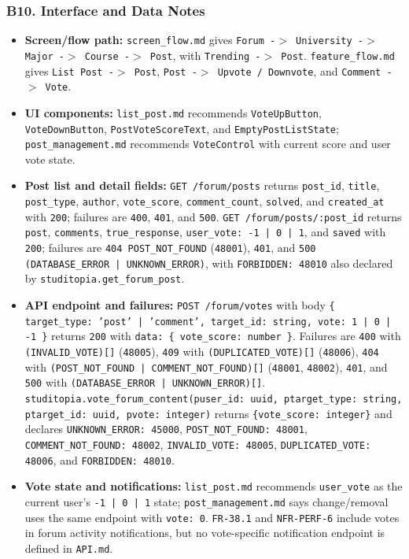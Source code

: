 \documentclass[12pt]{article}
\begin{document}
\hypertarget{sec:b10-interface-and-data-notes}{}
\subsubsection*{B10. Interface and Data Notes}
\par\medskip

\begin{itemize}
\item \textbf{Screen/flow path:} \texttt{screen\_flow.md} gives \texttt{Forum -$>$ University -$>$ Major -$>$ Course -$>$ Post}, with \texttt{Trending -$>$ Post}. \texttt{feature\_flow.md} gives \texttt{List Post -$>$ Post}, \texttt{Post -$>$ Upvote / Downvote}, and \texttt{Comment -$>$ Vote}.
\item \textbf{UI components:} \texttt{list\_post.md} recommends \texttt{VoteUpButton}, \texttt{VoteDownButton}, \texttt{PostVoteScoreText}, and \texttt{EmptyPostListState}; \texttt{post\_management.md} recommends \texttt{VoteControl} with current score and user vote state.
\item \textbf{Post list and detail fields:} \texttt{GET /forum/posts} returns \texttt{post\_id}, \texttt{title}, \texttt{post\_type}, \texttt{author}, \texttt{vote\_score}, \texttt{comment\_count}, \texttt{solved}, and \texttt{created\_at} with \texttt{200}; failures are \texttt{400}, \texttt{401}, and \texttt{500}. \texttt{GET /forum/posts/:post\_id} returns \texttt{post}, \texttt{comments}, \texttt{true\_response}, \texttt{user\_vote: -1 | 0 | 1}, and \texttt{saved} with \texttt{200}; failures are \texttt{404 POST\_NOT\_FOUND} (\texttt{48001}), \texttt{401}, and \texttt{500 (DATABASE\_ERROR | UNKNOWN\_ERROR)}, with \texttt{FORBIDDEN: 48010} also declared by \texttt{studitopia.get\_forum\_post}.
\item \textbf{API endpoint and failures:} \texttt{POST /forum/votes} with body \texttt{\{ target\_type: 'post' | 'comment', target\_id: string, vote: 1 | 0 | -1 \}} returns \texttt{200} with \texttt{data: \{ vote\_score: number \}}. Failures are \texttt{400} with \texttt{(INVALID\_VOTE)[]} (\texttt{48005}), \texttt{409} with \texttt{(DUPLICATED\_VOTE)[]} (\texttt{48006}), \texttt{404} with \texttt{(POST\_NOT\_FOUND | COMMENT\_NOT\_FOUND)[]} (\texttt{48001}, \texttt{48002}), \texttt{401}, and \texttt{500} with \texttt{(DATABASE\_ERROR | UNKNOWN\_ERROR)[]}. \texttt{studitopia.vote\_forum\_content(puser\_id: uuid, ptarget\_type: string, ptarget\_id: uuid, pvote: integer)} returns \texttt{\{vote\_score: integer\}} and declares \texttt{UNKNOWN\_ERROR: 45000}, \texttt{POST\_NOT\_FOUND: 48001}, \texttt{COMMENT\_NOT\_FOUND: 48002}, \texttt{INVALID\_VOTE: 48005}, \texttt{DUPLICATED\_VOTE: 48006}, and \texttt{FORBIDDEN: 48010}.
\item \textbf{Vote state and notifications:} \texttt{list\_post.md} recommends \texttt{user\_vote} as the current user's \texttt{-1 | 0 | 1} state; \texttt{post\_management.md} says change/removal uses the same endpoint with \texttt{vote: 0}. \texttt{FR-38.1} and \texttt{NFR-PERF-6} include votes in forum activity notifications, but no vote-specific notification endpoint is defined in \texttt{API.md}.
\end{itemize}
\end{document}
